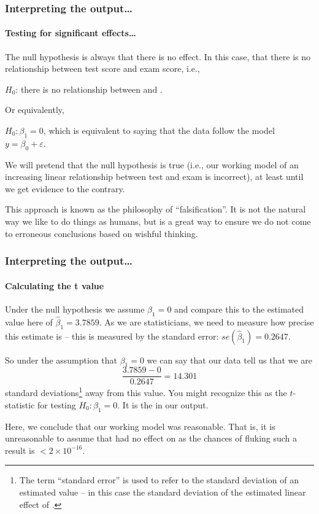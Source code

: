 \documentclass{beamer}\usepackage[]{graphicx}\usepackage[]{xcolor}
\begin{document}
\begin{frame}[fragile]
\frametitle{Interpreting the output\ldots}
\framesubtitle{Testing for significant effects\ldots}

The null hypothesis is always that there is no effect. 
In this case, that there is no relationship between test score and exam score, i.e.,

$H_0$: there is no relationship between  and .

Or equivalently,

$H_0:\beta_1=0$, which is equivalent to saying that the data follow the  model $y=\beta_0+ \varepsilon$. 


We will pretend that the null hypothesis is true (i.e., our working model of an increasing linear relationship between test and exam is incorrect), at least until we get evidence to the contrary.
\medskip

This approach is known as the philosophy of ``falsification''. 
It is not the natural way we like to do things as humans, 
but is a great way to ensure we do not come to erroneous conclusions based on wishful thinking.

\end{frame}


\begin{frame}[fragile]
\frametitle{Interpreting the output\ldots}
\framesubtitle{Calculating the t value}


Under the null hypothesis we assume $\beta_1=0$ and compare this to the estimated value here of $\hat{\beta}_1=3.7859$.
As we are statisticians, we need to measure how precise this estimate is -- this is measured by the standard error: $se(\hat{\beta}_1)=0.2647$.

So under the assumption that $\beta_1=0$ we can say that our data tell us that we are 
\[
\frac{3.7859-0}{0.2647} =14.301
\]
standard deviations\footnote{The term ``standard error'' is used to refer to the standard deviation of an estimated value -- in this case the standard deviation of the estimated linear effect of .}  away from this value. 
You might recognize this as the $t$-statistic for testing $H_0:\beta_1=0$.
It is the  in our output. 

Here, we conclude that our working model was reasonable. That is, it is unreasonable to assume that  had no effect on  as the chances of fluking such a result is $<2\times 10^{-16}$.

\end{frame}
\end{document}
